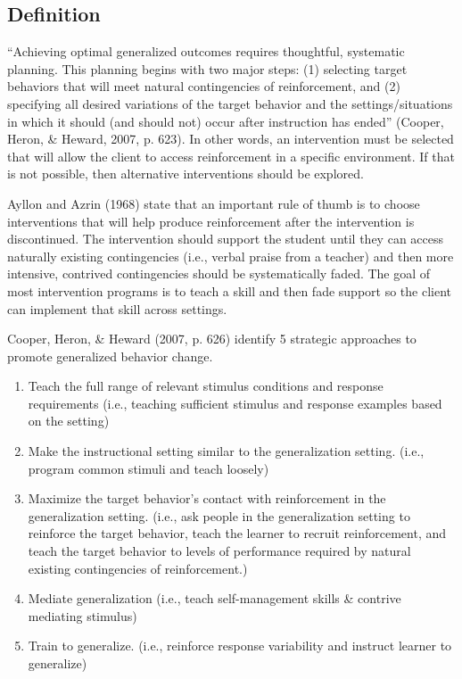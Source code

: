 \subsection{Definition}
``Achieving optimal generalized outcomes requires thoughtful, systematic planning. This planning begins with two major steps: (1) selecting target behaviors that will meet natural contingencies of reinforcement, and (2) specifying all desired variations of the target behavior and the settings/situations in which it should (and should not) occur after instruction has ended'' (Cooper, Heron, \& Heward, 2007, p. 623). In other words, an intervention must be selected that will allow the client to access reinforcement in a specific environment. If that is not possible, then alternative interventions should be explored. 

Ayllon and Azrin (1968) state that an important rule of thumb is to choose interventions that will help produce reinforcement after the intervention is discontinued. The intervention should support the student until they can access naturally existing contingencies (i.e., verbal praise from a teacher) and then more intensive, contrived contingencies should be systematically faded. The goal of most intervention programs is to teach a skill and then fade support so the client can implement that skill across settings. 

Cooper, Heron, \& Heward (2007, p. 626) identify 5 strategic approaches to promote generalized behavior change.
\begin{enumerate}
\item Teach the full range of relevant stimulus conditions and response requirements (i.e., teaching sufficient stimulus and response examples based on the setting)
\item Make the instructional setting similar to the generalization setting. (i.e., program common stimuli and teach loosely)
\item Maximize the target behavior's contact with reinforcement in the generalization setting. (i.e., ask people in the generalization setting to reinforce the target behavior, teach the learner to recruit reinforcement, and teach the target behavior to levels of performance required by natural existing contingencies of reinforcement.)
\item Mediate generalization (i.e., teach self-management skills \& contrive mediating stimulus)
\item Train to generalize. (i.e., reinforce response variability and instruct learner to generalize)
\end{enumerate}
%
